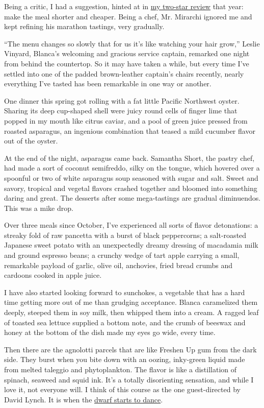 Being a critic, I had a suggestion, hinted at in
\href{http://www.nytimes3xbfgragh.onion/2012/10/17/dining/reviews/restaurant-review-blanca-in-bushwick.html}{my
two-star review} that year: make the meal shorter and cheaper. Being a
chef, Mr. Mirarchi ignored me and kept refining his marathon tastings,
very gradually.

``The menu changes so slowly that for us it's like watching your hair
grow,'' Leslie Vinyard, Blanca's welcoming and gracious service captain,
remarked one night from behind the countertop. So it may have taken a
while, but every time I've settled into one of the padded brown-leather
captain's chairs recently, nearly everything I've tasted has been
remarkable in one way or another.

One dinner this spring got rolling with a fat little Pacific Northwest
oyster. Sharing its deep cup-shaped shell were juicy round cells of
finger lime that popped in my mouth like citrus caviar, and a pool of
green juice pressed from roasted asparagus, an ingenious combination
that teased a mild cucumber flavor out of the oyster.

At the end of the night, asparagus came back. Samantha Short, the pastry
chef, had made a sort of coconut semifreddo, silky on the tongue, which
hovered over a spoonful or two of white asparagus soup seasoned with
sugar and salt. Sweet and savory, tropical and vegetal flavors crashed
together and bloomed into something daring and great. The desserts after
some mega-tastings are gradual diminuendos. This was a mike drop.

Over three meals since October, I've experienced all sorts of flavor
detonations: a streaky fold of raw pancetta with a burst of black
peppercorns; a salt-roasted Japanese sweet potato with an unexpectedly
dreamy dressing of macadamia milk and ground espresso beans; a crunchy
wedge of tart apple carrying a small, remarkable payload of garlic,
olive oil, anchovies, fried bread crumbs and cardoons cooked in apple
juice.

I have also started looking forward to sunchokes, a vegetable that has a
hard time getting more out of me than grudging acceptance. Blanca
caramelized them deeply, steeped them in soy milk, then whipped them
into a cream. A ragged leaf of toasted sea lettuce supplied a bottom
note, and the crumb of beeswax and honey at the bottom of the dish made
my eyes go wide, every time.

Then there are the agnolotti parcels that are like Freshen Up gum from
the dark side. They burst when you bite down with an oozing, inky-green
liquid made from melted taleggio and phytoplankton. The flavor is like a
distillation of spinach, seaweed and squid ink. It's a totally
disorienting sensation, and while I love it, not everyone will. I think
of this course as the one guest-directed by David Lynch. It is when the
\href{https://www.youtube.com/watch?v=kb9Acr_OHCw}{dwarf starts to
dance}.

